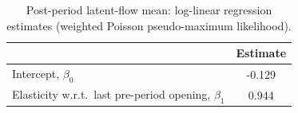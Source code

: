 \begin{table}[t]
  \centering
  \caption{Post-period latent-flow mean: log-linear regression estimates (weighted Poisson pseudo-maximum likelihood).}
  \label{tab:model_latent_negative_binomial}
\begin{tabular}{lc}
\toprule
 & Estimate \\
\midrule
Intercept, $\beta_0$                                  & -0.129 \\
Elasticity w.r.t.\ last pre-period opening, $\beta_1$ & 0.944 \\
\bottomrule
\end{tabular}
\end{table}
